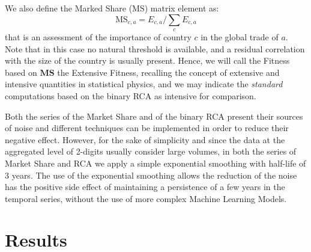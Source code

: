 \documentclass[fleqn,10pt]{article}
\begin{document}
We also define the Marked Share (MS) matrix element as:
\begin{equation}
	\mathrm{MS}_{c,a}=E _{c,a}/\sum_c E _{c,a}
\end{equation}
that is an assessment of the importance of country $c$ in the global trade of $a$. 
Note that in this case no natural threshold is available, and a residual correlation with the size of the country is usually present.
Hence, we will call the Fitness based on $\textbf{MS}$ the Extensive Fitness, recalling the concept of extensive and intensive quantities in statistical physics, and we may indicate the \textit{standard} computations based on the binary RCA as intensive for comparison.

Both the series of the Market Share and of the binary RCA present their sources of noise and different techniques can be implemented in order to reduce their negative effect.
However, for the sake of simplicity and since the data at the aggregated level of 2-digits usually consider large volumes, in both the series of Market Share and RCA we apply a simple exponential smoothing with half-life of 3 years.
The use of the exponential smoothing allows the reduction of the noise has the positive side effect of maintaining a persistence of a few years in the temporal series, without the use of more complex Machine Learning Models.




\section*{Results}
\end{document}
